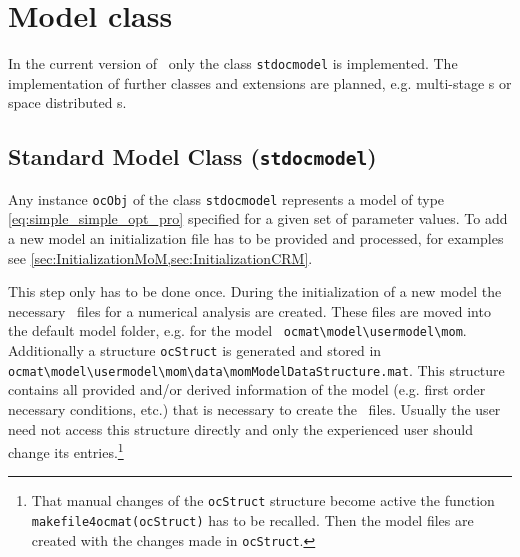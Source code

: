 \section{Model class}
In the current version of \OCMAT\ only the class \lstinline+stdocmodel+ is implemented. The implementation of further classes and extensions are planned, e.g. multi-stage \OCPRO s or space distributed \OCPRO s.

\subsection{Standard Model Class (\texorpdfstring{\lstinline+stdocmodel+}{stdocmodel})}
Any instance \lstinline+ocObj+ of the class \lstinline+stdocmodel+ represents a model of type \cref{eq:simple_simple_opt_pro} specified for a given set of parameter values. To add a new model an initialization file has to be provided and processed, for examples see \cref{sec:InitializationMoM,sec:InitializationCRM}. 

This step only has to be done once. During the initialization of a new model the necessary \MATL\ files for a numerical analysis are created. These files are moved into the default model folder, e.g. for the model \MoM\ \lstinline+ocmat\model\usermodel\mom+. Additionally a structure \lstinline+ocStruct+ is generated and stored in \lstinline+ocmat\model\usermodel\mom\data\momModelDataStructure.mat+. This structure contains all provided and/or derived information of the model (e.g. first order necessary conditions, etc.) that is necessary to create the \MATL\ files. Usually the user need not access this structure directly and only  the experienced user should change its entries.\footnote{That manual changes of the \lstinline+ocStruct+ structure become active the function \lstinline+makefile4ocmat(ocStruct)+ has to be recalled. Then the model files are created with the changes made in \lstinline+ocStruct+.}

